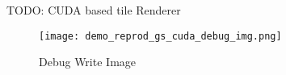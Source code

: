 TODO: CUDA based tile Renderer

\begin{figure}[H]
    \centering
    \texttt{[image: demo\_reprod\_gs\_cuda\_debug\_img.png]}
    \caption{Debug Write Image }
    \label{fig:reprod_gs_cuda_debug_img}
\end{figure}